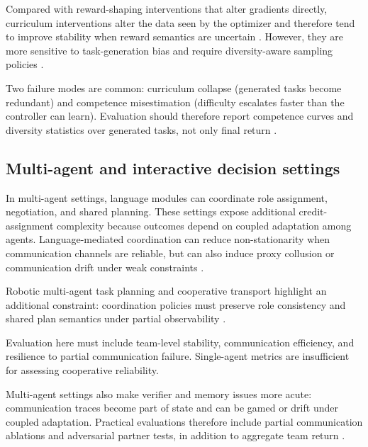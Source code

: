 ﻿\documentclass[conference]{IEEEtran}
\begin{document}
Compared with reward-shaping interventions that alter gradients directly, curriculum interventions alter the data seen by the optimizer and therefore tend to improve stability when reward semantics are uncertain \cite{arxiv_p_2310_12931,arxiv_p_2510_20867,arxiv_p_2602_11551}. However, they are more sensitive to task-generation bias and require diversity-aware sampling policies \cite{arxiv_p_2512_24653,arxiv_p_2601_18225,arxiv_p_2601_20802}.

Two failure modes are common: curriculum collapse (generated tasks become redundant) and competence misestimation (difficulty escalates faster than the controller can learn). Evaluation should therefore report competence curves and diversity statistics over generated tasks, not only final return \cite{arxiv_p_2512_16848,arxiv_p_2602_07906,arxiv_p_2601_16486,arxiv_p_2602_10576}.

\subsection{Multi-agent and interactive decision settings}
In multi-agent settings, language modules can coordinate role assignment, negotiation, and shared planning. These settings expose additional credit-assignment complexity because outcomes depend on coupled adaptation among agents. Language-mediated coordination can reduce non-stationarity when communication channels are reliable, but can also induce proxy collusion or communication drift under weak constraints \cite{arxiv_p_2304_07297,arxiv_p_2310_03903,arxiv_p_2602_08335,arxiv_p_2602_11583}.

Robotic multi-agent task planning and cooperative transport highlight an additional constraint: coordination policies must preserve role consistency and shared plan semantics under partial observability \cite{arxiv_p_2309_10062,arxiv_p_2602_07776}.

Evaluation here must include team-level stability, communication efficiency, and resilience to partial communication failure. Single-agent metrics are insufficient for assessing cooperative reliability.

Multi-agent settings also make verifier and memory issues more acute: communication traces become part of state and can be gamed or drift under coupled adaptation. Practical evaluations therefore include partial communication ablations and adversarial partner tests, in addition to aggregate team return \cite{arxiv_p_2310_03903,arxiv_p_2602_11583,arxiv_p_2511_03181,doi_p_10_18653_v1_2023_emnlp_main_13}.
\end{document}
